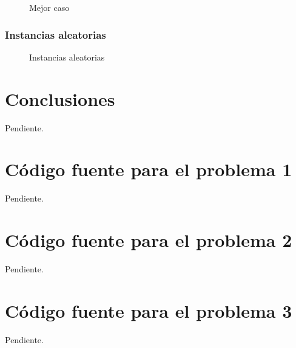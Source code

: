 \documentclass[a4paper, 10pt, twoside]{article}
\begin{document}
\begin{figure}[H]
  \centering
  
  \caption{Mejor caso}
\end{figure}


\subsubsection{Instancias aleatorias}

\begin{figure}[H]
  \centering
  
  \caption{Instancias aleatorias}
\end{figure}




\newpage

\section{Conclusiones}

Pendiente.




\newpage

\begin{appendices}

\section{Código fuente para el problema 1}

Pendiente.




\newpage

\section{Código fuente para el problema 2}

Pendiente.




\newpage

\section{Código fuente para el problema 3}

Pendiente.


\end{appendices}
\end{document}
